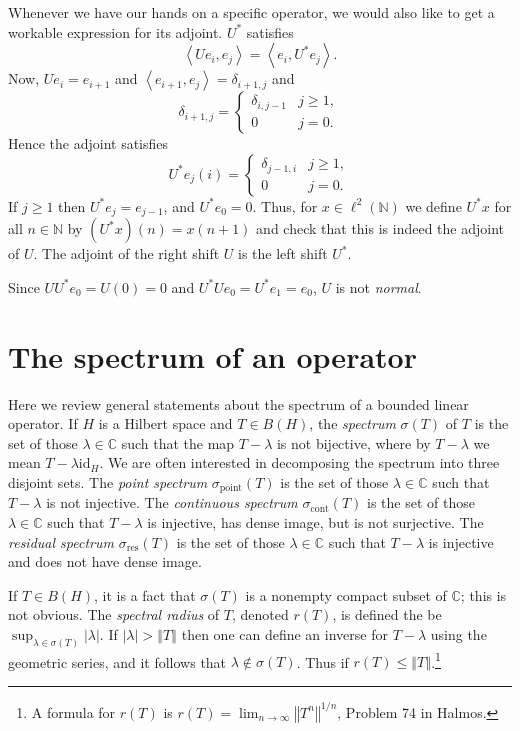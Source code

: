 \documentclass{article}
\newcommand{\inner}[2]{\left\langle #1, #2 \right\rangle}
\newcommand{\point}{\sigma_{\textrm{point}}}
\newcommand{\cont}{\sigma_{\textrm{cont}}}
\newcommand{\residual}{\sigma_{\textrm{res}}}
\newcommand{\id}{\textrm{id}}
\newcommand{\norm}[1]{\left\Vert #1 \right\Vert}
\begin{document}
Whenever we have our hands on a specific operator, we would also like to get a workable expression for its adjoint. $U^*$ satisfies
\[
\inner{Ue_i}{e_j}=\inner{e_i}{U^* e_j}.
\]
Now, $Ue_i=e_{i+1}$ and $\inner{e_{i+1}}{e_j}=\delta_{i+1,j}$ and
\[
\delta_{i+1,j}=\begin{cases}
\delta_{i,j-1}&j \geq 1,\\
0&j=0.
\end{cases}
\]
Hence the adjoint satisfies
\[
U^* e_j(i)= 
\begin{cases}
\delta_{j-1,i}&j \geq 1,\\
0&j=0.
\end{cases}
\]
If $j \geq 1$ then $U^* e_j=e_{j-1}$, and $U^* e_0=0$. Thus, for $x \in \ell^2(\mathbb{N})$ we define $U^*x$ for all $n \in \mathbb{N}$ by
$(U^*x)(n)=x(n+1)$ and check that this is indeed the adjoint of $U$.
The adjoint of the right shift $U$ is the left shift $U^*$.

Since $UU^*e_0=U(0)=0$ and $U^*Ue_0=U^*e_1=e_0$, $U$ is not {\em normal}. 

\section{The spectrum of an operator}
\label{generalities}
Here we review general statements about the spectrum of a bounded linear operator. If $H$ is a Hilbert space and $T \in B(H)$, the {\em spectrum} $\sigma(T)$ of
$T$ is the set of those $\lambda \in \mathbb{C}$ such that the map $T-\lambda$ is not bijective, where by $T-\lambda$ we mean $T-\lambda \id_H$. 
We are often interested in decomposing the spectrum into three disjoint sets. The {\em point spectrum} $\point(T)$ is the set of those $\lambda \in \mathbb{C}$ such that
$T-\lambda$ is not injective. The {\em continuous spectrum} $\cont(T)$ is the set of those $\lambda \in \mathbb{C}$ such that $T-\lambda$ is injective, has dense image, but is not surjective.
The {\em residual spectrum} $\residual(T)$ is the set of those $\lambda \in \mathbb{C}$ such that $T-\lambda$ is injective and does not have dense image.

If $T \in B(H)$, it is a fact that $\sigma(T)$ is a  nonempty compact subset of $\mathbb{C}$; this is not obvious. The {\em spectral radius} of $T$, denoted $r(T)$,
is defined the be $\sup_{\lambda \in \sigma(T)} |\lambda|$. If $|\lambda| > \norm{T}$ then one can define an inverse for $T-\lambda$ using the geometric series, and it follows that
$\lambda \not \in \sigma(T)$. Thus if $r(T) \leq \norm{T}$.\footnote{A formula for $r(T)$ is $r(T)=\lim_{n \to \infty} \norm{T^n}^{1/n}$, Problem 74 in Halmos.}
\end{document}
